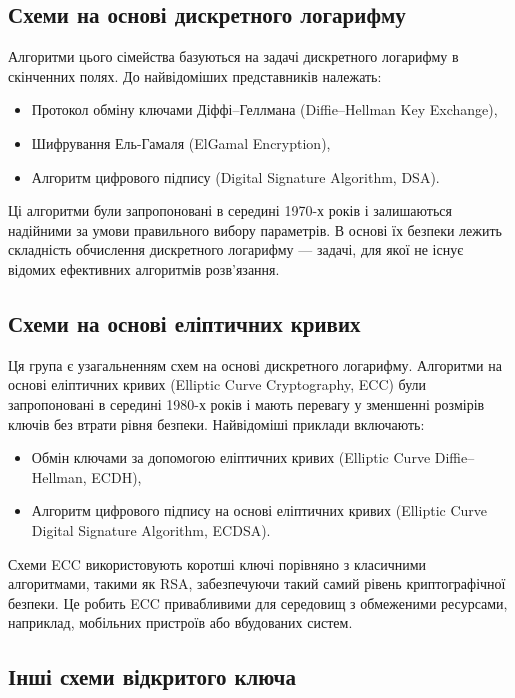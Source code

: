 \documentclass[12pt]{report}
\theoremstyle{definition}
\theoremstyle{plain}
\begin{document}
\subsection{Схеми на основі дискретного логарифму}

Алгоритми цього сімейства базуються на задачі дискретного логарифму в скінченних полях. До найвідоміших представників належать:
\begin{itemize}
    \item Протокол обміну ключами Діффі–Геллмана (Diffie–Hellman Key Exchange),
    \item Шифрування Ель-Гамаля (ElGamal Encryption),
    \item Алгоритм цифрового підпису (Digital Signature Algorithm, DSA).
\end{itemize}

Ці алгоритми були запропоновані в середині 1970-х років і залишаються надійними за умови правильного вибору параметрів. В основі їх безпеки лежить складність обчислення дискретного логарифму — задачі, для якої не існує відомих ефективних алгоритмів розв’язання.

\subsection{Схеми на основі еліптичних кривих}

Ця група є узагальненням схем на основі дискретного логарифму. Алгоритми на основі еліптичних кривих (Elliptic Curve Cryptography, ECC) були запропоновані в середині 1980-х років і мають перевагу у зменшенні розмірів ключів без втрати рівня безпеки. Найвідоміші приклади включають:
\begin{itemize}
    \item Обмін ключами за допомогою еліптичних кривих (Elliptic Curve Diffie–Hellman, ECDH),
    \item Алгоритм цифрового підпису на основі еліптичних кривих (Elliptic Curve Digital Signature Algorithm, ECDSA).
\end{itemize}

Схеми ECC використовують коротші ключі порівняно з класичними алгоритмами, такими як RSA, забезпечуючи такий самий рівень криптографічної безпеки. Це робить ECC привабливими для середовищ з обмеженими ресурсами, наприклад, мобільних пристроїв або вбудованих систем.

\subsection{Інші схеми відкритого ключа}
\end{document}
